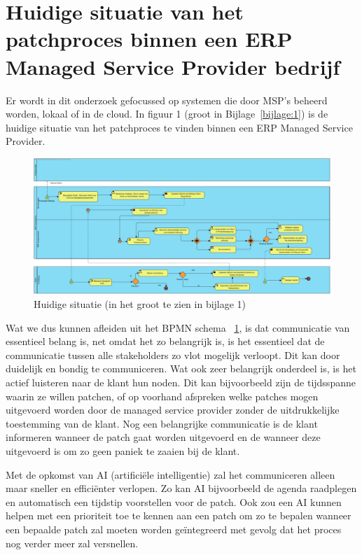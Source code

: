 \section{Huidige situatie van het patchproces binnen een ERP Managed Service Provider bedrijf}

Er wordt in dit onderzoek gefocussed op systemen die door MSP's beheerd worden, lokaal of in de cloud. In figuur 1 (groot in Bijlage~\ref{bijlage:1}) is de 
huidige situatie van het patchproces te vinden binnen een ERP Managed Service Provider. \\

\begin{figure}[h]
    \centering
    \includegraphics[width=\textwidth]{huidigesituatie.jpg}
    \caption{Huidige situatie (in het groot te zien in bijlage 1)}
    \label{fig:huidigesituatie}
\end{figure}
\newpage

Wat we dus kunnen afleiden uit het BPMN schema ~\ref{fig:huidigesituatie}, is dat communicatie van essentieel belang is, net omdat het zo belangrijk is, is het essentieel dat de communicatie tussen alle stakeholders zo vlot mogelijk verloopt. Dit kan door duidelijk en bondig te communiceren. Wat 
ook zeer belangrijk onderdeel is, is het actief luisteren naar de klant hun noden. Dit kan bijvoorbeeld zijn de tijdsspanne waarin ze willen patchen, of op voorhand afspreken
 welke patches mogen uitgevoerd worden door de managed service provider zonder de uitdrukkelijke toestemming van de klant. Nog een belangrijke communicatie is de klant informeren wanneer de patch gaat worden uitgevoerd en de wanneer deze uitgevoerd is om zo geen paniek te zaaien bij de klant. 

 Met de opkomst van AI (artificiële intelligentie) zal het communiceren alleen maar sneller en efficiënter verlopen. Zo kan AI bijvoorbeeld de agenda raadplegen en automatisch een tijdstip voorstellen voor de patch. Ook zou een AI kunnen helpen met een 
prioriteit toe te kennen aan een patch om zo te bepalen wanneer een bepaalde patch zal moeten worden geïntegreerd met gevolg dat het proces nog verder meer zal versnellen. \\

